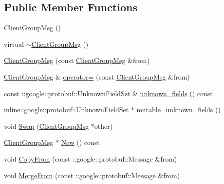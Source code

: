 \subsection*{Public Member Functions}
\begin{DoxyCompactItemize}
\item 
\hyperlink{class_i_m_1_1_base_define_1_1_client_group_msg_a9e4b8f58ac04529bc9fcead90c730a82}{Client\+Group\+Msg} ()
\item 
virtual \hyperlink{class_i_m_1_1_base_define_1_1_client_group_msg_a4fa1f8a4a55422fb5ddbf4698b9583a4}{$\sim$\+Client\+Group\+Msg} ()
\item 
\hyperlink{class_i_m_1_1_base_define_1_1_client_group_msg_a8f17664c744a562629561a1ae676377b}{Client\+Group\+Msg} (const \hyperlink{class_i_m_1_1_base_define_1_1_client_group_msg}{Client\+Group\+Msg} \&from)
\item 
\hyperlink{class_i_m_1_1_base_define_1_1_client_group_msg}{Client\+Group\+Msg} \& \hyperlink{class_i_m_1_1_base_define_1_1_client_group_msg_a397d0b9620caa07274f4369bef555e80}{operator=} (const \hyperlink{class_i_m_1_1_base_define_1_1_client_group_msg}{Client\+Group\+Msg} \&from)
\item 
const \+::google\+::protobuf\+::\+Unknown\+Field\+Set \& \hyperlink{class_i_m_1_1_base_define_1_1_client_group_msg_aee5147f2e89ed12769a9a3963895bc6a}{unknown\+\_\+fields} () const 
\item 
inline\+::google\+::protobuf\+::\+Unknown\+Field\+Set $\ast$ \hyperlink{class_i_m_1_1_base_define_1_1_client_group_msg_a7f08265598991361a036f791f0aff09b}{mutable\+\_\+unknown\+\_\+fields} ()
\item 
void \hyperlink{class_i_m_1_1_base_define_1_1_client_group_msg_a95ef146b333a29bee4ab50db4f9deec7}{Swap} (\hyperlink{class_i_m_1_1_base_define_1_1_client_group_msg}{Client\+Group\+Msg} $\ast$other)
\item 
\hyperlink{class_i_m_1_1_base_define_1_1_client_group_msg}{Client\+Group\+Msg} $\ast$ \hyperlink{class_i_m_1_1_base_define_1_1_client_group_msg_a756f0d75a733a32f9cfcca97a13439e3}{New} () const 
\item 
void \hyperlink{class_i_m_1_1_base_define_1_1_client_group_msg_a9e79a383900bbdda09f5e68f29af7021}{Copy\+From} (const \+::google\+::protobuf\+::\+Message \&from)
\item 
void \hyperlink{class_i_m_1_1_base_define_1_1_client_group_msg_ac8faa26a1b6bebc7b02c9a1ee2c60835}{Merge\+From} (const \+::google\+::protobuf\+::\+Message \&from)
\item 

\end{DoxyCompactItemize}
